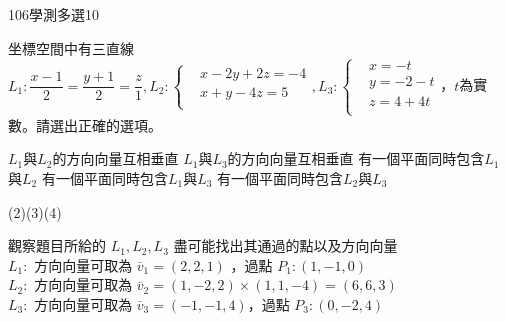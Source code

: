 \begin{QUESTIONS}
\begin{QUESTION}
\begin{QSOLLIST}
        \end{QSOLLIST}
        \begin{QEMPTYSPACE}
        \end{QEMPTYSPACE}
    \end{QUESTION}
    \begin{QUESTION}
        \begin{ExamInfo}{106}{學測}{多選}{10}
        \end{ExamInfo}
        \begin{ExamAnsRateInfo}{43}{66}{39}{24}
        \end{ExamAnsRateInfo}
        \begin{QBODY}
            坐標空間中有三直線${{L}_{1}}:\dfrac{x-1}{2}=\dfrac{y+1}{2}=\dfrac{z}{1},{{L}_{2}}:\left\{ \begin{aligned}
			& x-2y+2z=-4 \\ 
			& x+y-4z=5 \\ 
			\end{aligned} \right.,{{L}_{3}}:\left\{ \begin{aligned}
			& x=-t \\ 
			& y=-2-t \\ 
			& z=4+4t \\ 
			\end{aligned} \right.$，$t$為實數。請選出正確的選項。
			\begin{QOPS}
				\QOP ${{L}_{1}}$與${{L}_{2}}$的方向向量互相垂直
				\QOP ${{L}_{1}}$與${{L}_{3}}$的方向向量互相垂直
				\QOP 有一個平面同時包含${{L}_{1}}$與${{L}_{2}}$
				\QOP 有一個平面同時包含${{L}_{1}}$與${{L}_{3}}$
				\QOP 有一個平面同時包含${{L}_{2}}$與${{L}_{3}}$
			\end{QOPS}
        \end{QBODY}
        \begin{QFROMS}
        \end{QFROMS}
        \begin{QTAGS}\end{QTAGS}
        \begin{QANS}
            (2)(3)(4)
        \end{QANS}
        \begin{QSOLLIST}
            \begin{QSOL}[SOLID=32]
                觀察題目所給的 $L_1,L_2,L_3$ 盡可能找出其通過的點以及方向向量\\
                $L_1:$ 方向向量可取為 $\lvec{v_1} = (2,2,1)$ ，過點 $P_1:(1,-1,0)$\\
                $L_2:$ 方向向量可取為 $\lvec{v_2} = (1,-2,2)\times(1,1,-4)=(6,6,3)$\\
                $L_3:$ 方向向量可取為 $\lvec{v_3} = (-1,-1, 4)$，過點 $P_3:(0,-2,4)$\\
                

\end{QSOL}
\end{QSOLLIST}
\end{QUESTION}
\end{QUESTIONS}
